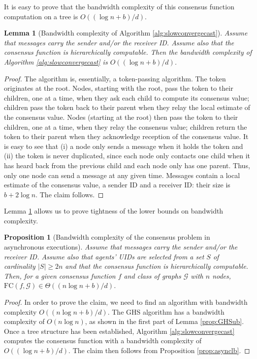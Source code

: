 \documentclass[letterpaper,10pt,conference]{ieeeconf}
\newtheorem{proposition}[theorem]{Proposition}
\newtheorem{lemma}[theorem]{Lemma}
\begin{document}
It is easy to prove that the bandwidth complexity of this consensus function computation on a tree is $O((\log n + b)/d)$.
\begin{lemma}[Bandwidth complexity of Algorithm \ref{alg:slowconvergecast}]
\label{prop:ccfc}
Assume that messages carry the sender and/or the receiver ID. Assume also that the consensus function is hierarchically computable. Then the bandwidth complexity of Algorithm \ref{alg:slowconvergecast} is $O((\log n + b)/d)$. 
\end{lemma}
\begin{proof}
The algorithm is, essentially, a token-passing algorithm. The token originates at the root. Nodes, starting with the root, pass the token to their children, one at a time, when they ask each child to compute its consensus value; children pass the token back to their parent when they relay the local estimate of the consensus value. Nodes (starting at the root) then pass the token to their children, one at a time, when they relay the consensus value; children return the token to their parent when they acknowledge reception of the consensus value. It is easy to see that (i) a node only sends a message when it holds the token and (ii) the token is never duplicated, since each node only contacts one child when it has heard back from the previous child and each node only has one parent. Thus, only one node can send a message at any given time. Messages contain a local estimate of the consensus value, a sender ID and a receiver ID: their size is $b+2\log n$. The claim follows.
\end{proof}

Lemma \ref{prop:ccfc} allows us to prove tightness of the lower bounds on bandwidth complexity.
\begin{proposition}[Bandwidth complexity of the consensus problem in asynchronous executions]
Assume that messages carry the sender and/or the receiver ID. Assume also that agents' UIDs are selected from a set $S$ of cardinality $|S|\geq 2n$ and that the consensus function is hierarchically computable. 
Then, for a given consensus function $f$ and class of graphs $\mathcal G$ with $n$ nodes,  $\textrm{FC}(f, \mathcal G) \in \Theta((n\log n+b) /d)$.
\end{proposition}
\begin{proof}
In order to prove the claim, we need to find an algorithm with bandwidth complexity $O((n\log n +b)/d)$. The GHS algorithm has a bandwidth complexity of $O(n\log n)$, as shown in the first part of Lemma \ref{prop:GHSub}. Once a tree structure has been established, Algorithm \ref{alg:slowconvergecast} computes the consensus function with a bandwidth complexity of $O((\log n + b)/d)$. The claim then follows from Proposition \ref{prop:asynclb}.
\end{proof}
\end{document}

